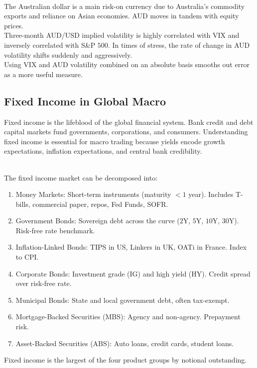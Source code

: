 \begin{remark} \\
The Australian dollar is a main risk-on currency due to Australia's commodity exports and reliance on Asian economies. AUD moves in tandem with equity prices.\\
Three-month AUD/USD implied volatility is highly correlated with VIX and inversely correlated with S\&P $500$. In times of stress, the rate of change in AUD volatility shifts suddenly and aggressively.\\
Using VIX and AUD volatility combined on an absolute basis smooths out error as a more useful measure.
\end{remark}

\subsection{Fixed Income in Global Macro}

Fixed income is the lifeblood of the global financial system. Bank credit and debt capital markets fund governments, corporations, and consumers. Understanding fixed income is essential for macro trading because yields encode growth expectations, inflation expectations, and central bank credibility.

\begin{remark} \\
The fixed income market can be decomposed into:
\begin{enumerate}[label=\roman*.]
\setlength{\itemsep}{0pt}
\item Money Markets: Short-term instruments (maturity $<1$ year). Includes T-bills, commercial paper, repos, Fed Funds, SOFR.
\item Government Bonds: Sovereign debt across the curve ($2$Y, $5$Y, $10$Y, $30$Y). Risk-free rate benchmark.
\item Inflation-Linked Bonds: TIPS in US, Linkers in UK, OATi in France. Index to CPI.
\item Corporate Bonds: Investment grade (IG) and high yield (HY). Credit spread over risk-free rate.
\item Municipal Bonds: State and local government debt, often tax-exempt.
\item Mortgage-Backed Securities (MBS): Agency and non-agency. Prepayment risk.
\item Asset-Backed Securities (ABS): Auto loans, credit cards, student loans.
\end{enumerate}
Fixed income is the largest of the four product groups by notional outstanding.
\end{remark}

